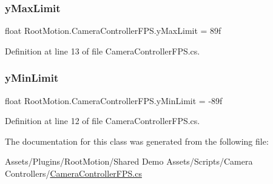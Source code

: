 \mbox{\label{class_root_motion_1_1_camera_controller_f_p_s_a253ae758f1b2ff3961b5077ff6f033ff}} 
\subsubsection{\texorpdfstring{y\+Max\+Limit}{yMaxLimit}}
{\footnotesize\ttfamily float Root\+Motion.\+Camera\+Controller\+F\+P\+S.\+y\+Max\+Limit = 89f}



Definition at line 13 of file Camera\+Controller\+F\+P\+S.\+cs.

\mbox{\label{class_root_motion_1_1_camera_controller_f_p_s_a1eca88254a7bae7212eb0fa7d59d023b}} 
\subsubsection{\texorpdfstring{y\+Min\+Limit}{yMinLimit}}
{\footnotesize\ttfamily float Root\+Motion.\+Camera\+Controller\+F\+P\+S.\+y\+Min\+Limit = -\/89f}



Definition at line 12 of file Camera\+Controller\+F\+P\+S.\+cs.



The documentation for this class was generated from the following file\+:\begin{DoxyCompactItemize}
\item 
Assets/\+Plugins/\+Root\+Motion/\+Shared Demo Assets/\+Scripts/\+Camera Controllers/\mbox{\hyperlink{_camera_controller_f_p_s_8cs}{Camera\+Controller\+F\+P\+S.\+cs}}\end{DoxyCompactItemize}

